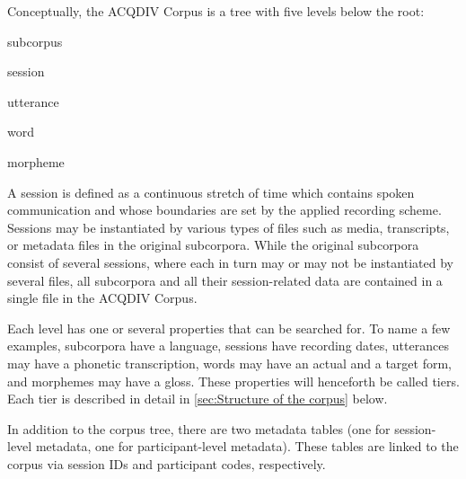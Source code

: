 \documentclass[a4paper, 11pt]{book}
\begin{document}
Conceptually, the ACQDIV Corpus is a tree with five levels below the root: 

\begin{itemize*}
	\item subcorpus
	\item session
	\item utterance
	\item word 
	\item morpheme
\end{itemize*}

A session is defined as a continuous stretch of time which contains spoken communication and whose boundaries are set by the applied recording scheme. Sessions may be instantiated by various types of files such as media, transcripts, or metadata files in the original subcorpora. While the original subcorpora consist of several sessions, where each in turn may or may not be instantiated by several files, all subcorpora and all their session-related data are contained in a single file in the ACQDIV Corpus. 

Each level has one or several properties that can be searched for. To name a few examples, subcorpora have a language, sessions have recording dates, utterances may have a phonetic transcription, words may have an actual and a target form, and morphemes may have a gloss. These properties will henceforth be called tiers. Each tier is described in detail in \autoref{sec:Structure of the corpus} below. 

In addition to the corpus tree, there are two metadata tables (one for session-level metadata, one for participant-level metadata). These tables are linked to the corpus via session IDs and participant codes, respectively. 

%
\end{document}
